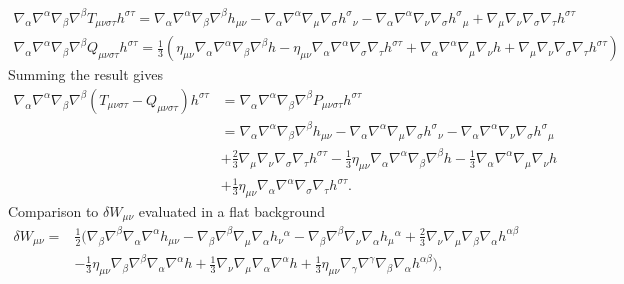 \documentclass[10pt,letterpaper]{article}
\begin{document}
\begin{align} \nabla_\alpha\nabla^\alpha \nabla_\beta\nabla^\beta T_{\mu\nu\sigma\tau}h^{\sigma\tau} = \nabla_\alpha\nabla^\alpha \nabla_\beta\nabla^\beta h_{\mu\nu}  - \nabla_\alpha\nabla^\alpha \nabla_\mu \nabla_\sigma h^{\sigma}{}_\nu - \nabla_\alpha\nabla^\alpha\nabla_\nu \nabla_\sigma h^\sigma{}_\mu + \nabla_\mu \nabla_\nu \nabla_\sigma\nabla_\tau h^{\sigma\tau}
\end{align}
\begin{align}
\nabla_\alpha\nabla^\alpha \nabla_\beta\nabla^\beta Q_{\mu\nu\sigma\tau}h^{\sigma\tau} = \frac{1}{3}\left( \eta_{\mu\nu} \nabla_\alpha\nabla^\alpha \nabla_\beta\nabla^\beta h - \eta_{\mu\nu} \nabla_\alpha\nabla^\alpha \nabla_\sigma\nabla_\tau h^{\sigma\tau} + \nabla_\alpha\nabla^\alpha \nabla_\mu\nabla_\nu h + \nabla_\mu\nabla_\nu \nabla_\sigma\nabla_\tau h^{\sigma\tau}
\right)
\end{align}
Summing the result gives
\begin{align} 
\nabla_\alpha\nabla^\alpha \nabla_\beta\nabla^\beta( T_{\mu\nu\sigma\tau}-Q_{\mu\nu\sigma\tau})h^{\sigma\tau}&=
\nabla_\alpha\nabla^\alpha \nabla_\beta\nabla^\beta P_{\mu\nu\sigma\tau}h^{\sigma\tau}\nonumber\\
&=\nabla_\alpha\nabla^\alpha \nabla_\beta\nabla^\beta h_{\mu\nu}- \nabla_\alpha\nabla^\alpha \nabla_\mu \nabla_\sigma h^{\sigma}{}_\nu - \nabla_\alpha\nabla^\alpha\nabla_\nu \nabla_\sigma h^\sigma{}_\mu\nonumber\\
&+\frac23  \nabla_\mu \nabla_\nu \nabla_\sigma\nabla_\tau h^{\sigma\tau} - \frac13 \eta_{\mu\nu} \nabla_\alpha\nabla^\alpha \nabla_\beta\nabla^\beta h -\frac13\nabla_\alpha\nabla^\alpha \nabla_\mu\nabla_\nu h \nonumber\\
& +\frac13\eta_{\mu\nu} \nabla_\alpha\nabla^\alpha \nabla_\sigma\nabla_\tau h^{\sigma\tau}.
\end{align}
Comparison to $\delta W_{\mu\nu}$ evaluated in a flat background
\begin{align}
\delta W_{\mu\nu}={}&\frac{1}{2}\bigg(\nabla_{\beta}\nabla^{\beta}\nabla_{\alpha}\nabla^{\alpha}h_{\mu \nu}
 - \nabla_{\beta}\nabla^{\beta} \nabla_{\mu}\nabla_{\alpha}h_{\nu}{}^{\alpha}
 -  \nabla_{\beta}\nabla^{\beta}\nabla_{\nu}\nabla_{\alpha}h_{\mu}{}^{\alpha}
+ \frac{2}{3} \nabla_{\nu}\nabla_{\mu}\nabla_{\beta}\nabla_{\alpha}h^{\alpha \beta}\nonumber\\
 &-  \frac{1}{3} \eta_{\mu \nu} \nabla_{\beta}\nabla^{\beta}\nabla_{\alpha}\nabla^{\alpha}h
+\frac{1}{3} \nabla_{\nu}\nabla_{\mu}\nabla_{\alpha}\nabla^{\alpha}h
 + \frac{1}{3} \eta_{\mu \nu} \nabla_{\gamma}\nabla^{\gamma}\nabla_{\beta}\nabla_{\alpha}h^{\alpha \beta}\bigg),
\end{align}
\end{document}
